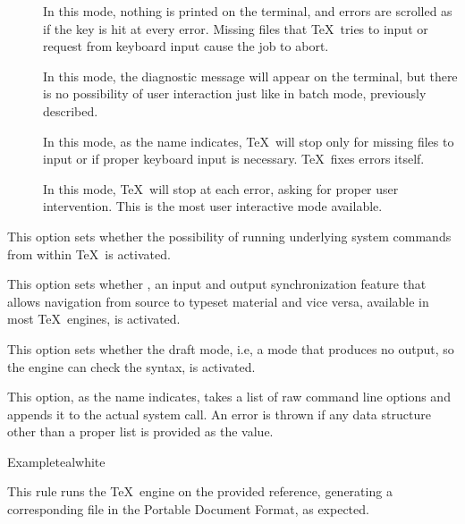 \begin{description}
\begin{description}
\begin{description}
\item[] In this mode, nothing is printed on the terminal, and errors are scrolled as if the  key is hit at every error. Missing files that \TeX\ tries to input or request from keyboard input cause the job to abort.

\item[] In this mode, the diagnostic message will appear on the terminal, but there is no possibility of user interaction just like in batch mode, previously described.

\item[] In this mode, as the name indicates, \TeX\ will stop only for missing files to input or if proper keyboard input is necessary. \TeX\ fixes errors itself.

\item[] In this mode, \TeX\ will stop at each error, asking for proper user intervention. This is the most user interactive mode available.
\end{description}

\item[\rpsbox{shell}] This option sets whether the possibility of running underlying system commands from within \TeX\ is activated.

\item[\rpsbox{synctex}] This option sets whether , an input and output synchronization feature that allows navigation from source to typeset material and vice versa, available in most \TeX\ engines, is activated.

\item[\rpsbox{draft}] This option sets whether the draft mode, i.e, a mode that produces no output, so the engine can check the syntax, is activated.

\item[\abox{options}] This option, as the name indicates, takes a list of raw command line options and appends it to the actual system call. An error is thrown if any data structure other than a proper list is provided as the value.
\end{description}

\begin{codebox}{Example}{teal}{\icnote}{white}
\end{codebox}

\item[\rulebox{pdflatex}]
This rule runs the  \TeX\ engine on the provided  reference, generating a corresponding file in the Portable Document Format, as expected.


\end{description}
